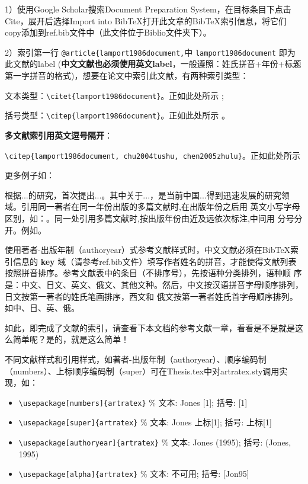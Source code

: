 1）使用Google Scholar搜索Document Preparation System，在目标条目下点击Cite，展开后选择Import into BibTeX打开此文章的BibTeX索引信息，将它们copy添加到ref.bib文件中（此文件位于Biblio文件夹下）。

2）索引第一行 \verb|@article{lamport1986document,|中 \verb|lamport1986document| 即为此文献的label (\textbf{中文文献也必须使用英文label}，一般遵照：姓氏拼音+年份+标题第一字拼音的格式)，想要在论文中索引此文献，有两种索引类型：

文本类型：\verb|\citet{lamport1986document}|。正如此处所示 \citet{lamport1986document}; 

括号类型：\verb|\citep{lamport1986document}|。正如此处所示 \citep{lamport1986document}。

\textbf{多文献索引用英文逗号隔开}：

\verb|\citep{lamport1986document, chu2004tushu, chen2005zhulu}|。正如此处所示 \citep{lamport1986document, chu2004tushu, chen2005zhulu}

更多例子如：

\citet{walls2013drought}根据...的研究，首次提出...。其中关于...\citep{walls2013drought}，是当前中国...得到迅速发展的研究领域\citep{chen1980zhongguo}。引用同一著者在同一年份出版的多篇文献时,在出版年份之后用
英文小写字母区别，如：\citep{yuan2012lana, yuan2012lanb, yuan2012lanc}。同一处引用多篇文献时,按出版年份由近及远依次标注,中间用
分号分开。例如\citep{chen1980zhongguo, stamerjohanns2009mathml, hls2012jinji, niu2013zonghe}。

使用著者-出版年制（authoryear）式参考文献样式时，中文文献必须在BibTeX索引信息的 \textbf{key} 域（请参考ref.bib文件）填写作者姓名的拼音，才能使得文献列表按照拼音排序。参考文献表中的条目（不排序号），先按语种分类排列，语种顺 序是：中文、日文、英文、俄文、其他文种。然后，中文按汉语拼音字母顺序排列，日文按第一著者的姓氏笔画排序，西文和 俄文按第一著者姓氏首字母顺序排列。如中\citep{niu2013zonghe}、日\citep{Bohan1928}、英\citep{stamerjohanns2009mathml}、俄\citep{Dubrovin1906}。

如此，即完成了文献的索引，请查看下本文档的参考文献一章，看看是不是就是这么简单呢？是的，就是这么简单！

不同文献样式和引用样式，如著者-出版年制（authoryear）、顺序编码制（numbers）、上标顺序编码制（super）可在Thesis.tex中对artratex.sty调用实现，如：
\begin{itemize}
    \footnotesize
    \item \verb+\usepackage[numbers]{artratex}+ $\%$ 文本: Jones [1]; 括号: [1]
    \item \verb+\usepackage[super]{artratex}+ $\%$ 文本: Jones 上标[1]; 括号: 上标[1]
    \item \verb+\usepackage[authoryear]{artratex}+ $\%$ 文本: Jones (1995); 括号: (Jones, 1995)
    \item \verb+\usepackage[alpha]{artratex}+ $\%$ 文本: 不可用; 括号: [Jon95]
\end{itemize}

